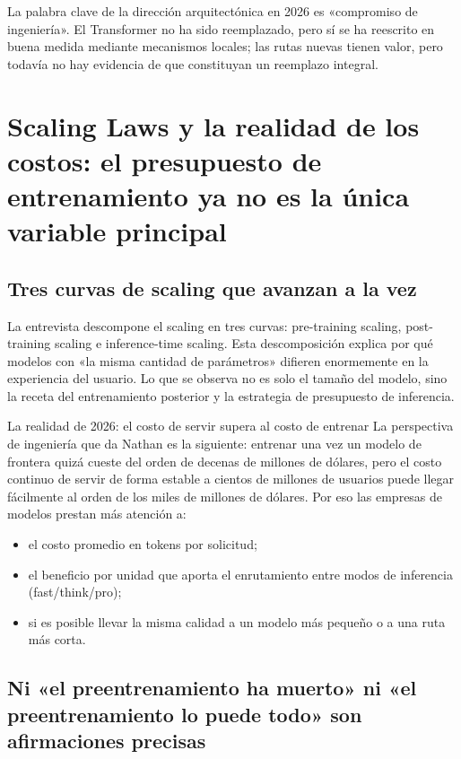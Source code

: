 \documentclass[a4paper]{article}
\begin{document}
La palabra clave de la dirección arquitectónica en 2026 es «compromiso de ingeniería». El Transformer no ha sido reemplazado, pero sí se ha reescrito en buena medida mediante mecanismos locales; las rutas nuevas tienen valor, pero todavía no hay evidencia de que constituyan un reemplazo integral.
\section{Scaling Laws y la realidad de los costos: el presupuesto de entrenamiento ya no es la única variable principal}

\subsection{Tres curvas de scaling que avanzan a la vez}

La entrevista descompone el scaling en tres curvas: pre-training scaling, post-training scaling e inference-time scaling. Esta descomposición explica por qué modelos con «la misma cantidad de parámetros» difieren enormemente en la experiencia del usuario. Lo que se observa no es solo el tamaño del modelo, sino la receta del entrenamiento posterior y la estrategia de presupuesto de inferencia.

\begin{importantbox}{La realidad de 2026: el costo de servir supera al costo de entrenar}
La perspectiva de ingeniería que da Nathan es la siguiente: entrenar una vez un modelo de frontera quizá cueste del orden de decenas de millones de dólares, pero el costo continuo de servir de forma estable a cientos de millones de usuarios puede llegar fácilmente al orden de los miles de millones de dólares. Por eso las empresas de modelos prestan más atención a:
\begin{itemize}[leftmargin=1.5em]
    \item el costo promedio en tokens por solicitud;
    \item el beneficio por unidad que aporta el enrutamiento entre modos de inferencia (fast/think/pro);
    \item si es posible llevar la misma calidad a un modelo más pequeño o a una ruta más corta.
\end{itemize}
\end{importantbox}

\subsection{Ni «el preentrenamiento ha muerto» ni «el preentrenamiento lo puede todo» son afirmaciones precisas}
\end{document}
